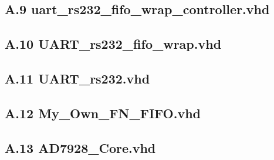\documentclass[12pt]{article}
\begin{document}
\subsection*{A.9 uart\_rs232\_fifo\_wrap\_controller.vhd}


\subsection*{A.10 UART\_rs232\_fifo\_wrap.vhd}


\subsection*{A.11 UART\_rs232.vhd}


\subsection*{A.12 My\_Own\_FN\_FIFO.vhd}


\subsection*{A.13 AD7928\_Core.vhd}

\end{document}
